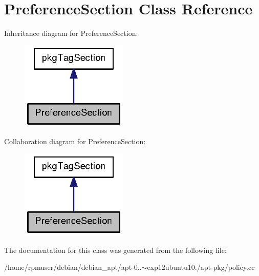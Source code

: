 \section{\-Preference\-Section \-Class \-Reference}
\label{classPreferenceSection}


\-Inheritance diagram for \-Preference\-Section\-:
\nopagebreak
\begin{figure}[H]
\begin{center}
\leavevmode
\includegraphics[width=144pt]{classPreferenceSection__inherit__graph}
\end{center}
\end{figure}


\-Collaboration diagram for \-Preference\-Section\-:
\nopagebreak
\begin{figure}[H]
\begin{center}
\leavevmode
\includegraphics[width=144pt]{classPreferenceSection__coll__graph}
\end{center}
\end{figure}


\-The documentation for this class was generated from the following file\-:\begin{DoxyCompactItemize}
\item 
/home/rpmuser/debian/debian\-\_\-apt/apt-\/0..$\sim$exp12ubuntu10./apt-\/pkg/policy.\-cc\end{DoxyCompactItemize}

